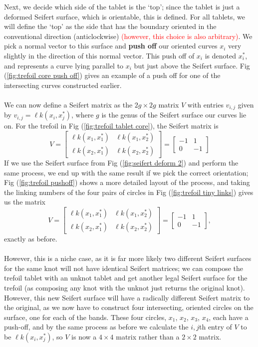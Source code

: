 \documentclass{article}
\begin{document}
Next, we decide which side of the tablet is the `top'; since the tablet is just a deformed Seifert surface, which is orientable, this is defined. For all tablets, we will define the `top' as the side that has the boundary oriented in the conventional direction (anticlockwise) \textcolor{red}{(however, this choice is also arbitrary)}. We pick a normal vector to this surface and \textbf{push off} our oriented curves $x_i$ very slightly in the direction of this normal vector. This push off of $x_i$ is denoted $x^*_i$, and represents a curve lying parallel to $x_i$ but just above the Seifert surface. Fig (\ref{fig:trefoil core push off}) gives an example of a push off for one of the intersecting curves constructed earlier.\\
\\
We can now define a Seifert matrix as the $2g \times 2g$ matrix $V$ with entries $v_{i,j}$ given by $v_{i,j}=\ell k(x_i,x^*_j)$, where $g$ is the genus of the Seifert surface our curves lie on. For the trefoil in Fig (\ref{fig:trefoil tablet core}), the Seifert matrix is
$$V=\begin{bmatrix}\ell k(x_1,x^*_1)&\ell k(x_1,x^*_2)\\\ell k(x_2,x^*_1)&\ell k(x_2,x^*_2)\end{bmatrix}=\begin{bmatrix}-1&1\\0&-1\end{bmatrix}$$
If we use the Seifert surface from Fig (\ref{fig:seifert deform 2}) and perform the same process, we end up with the same result if we pick the correct orientation; Fig (\ref{fig:trefoil pushoff}) shows a more detailed layout of the process, and taking the linking numbers of the four pairs of circles in Fig (\ref{fig:trefoil tiny links}) gives us the matrix $$V=\begin{bmatrix}\ell k(x_1,x^*_1)&\ell k(x_1,x^*_2)\\\ell k(x_2,x^*_1)&\ell k(x_2,x^*_2)\end{bmatrix}=\begin{bmatrix}-1&1\\0&-1\end{bmatrix},$$ exactly as before.\\
\\
However, this is a niche case, as it is far more likely two different Seifert surfaces for the same knot will not have identical Seifert matrices; we can compose the trefoil tablet with an unknot tablet and get another legal Seifert surface for the trefoil (as composing any knot with the unknot just returns the original knot). However, this new Seifert surface will have a radically different Seifert matrix to the original, as we now have to construct four intersecting, oriented circles on the surface, one for each of the bands. These four circles, $x_1$, $x_2$, $x_3$, $x_4$, each have a push-off, and by the same process as before we calculate the $i,j$th entry of $V$ to be $\ell k(x_i,x_j^*)$, so $V$ is now a $4\times 4$ matrix rather than a $2\times2$ matrix.\\
\end{document}
